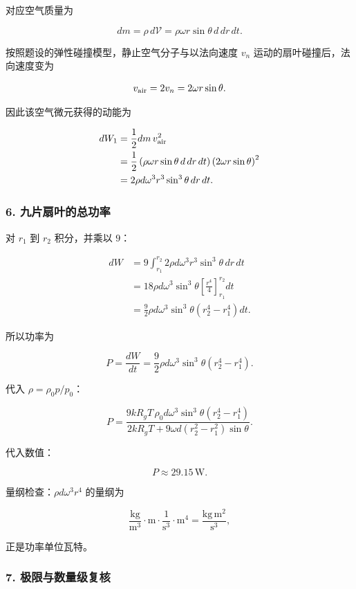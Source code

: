 \documentclass[12pt,a4paper,UTF8]{ctexart}
\begin{document}
对应空气质量为

\[
dm=\rho\,d\mathcal V
=\rho\omega r\sin\theta\,d\,dr\,dt.
\]

按照题设的弹性碰撞模型，静止空气分子与以法向速度 \(v_n\)
运动的扇叶碰撞后，法向速度变为

\[
v_{\rm air}=2v_n=2\omega r\sin\theta.
\]

因此该空气微元获得的动能为

\[
\begin{aligned}
dW_1
&=\frac12dm\,v_{\rm air}^2\\
&=\frac12\left(\rho\omega r\sin\theta\,d\,dr\,dt\right)
\left(2\omega r\sin\theta\right)^2\\
&=2\rho d\omega^3r^3\sin^3\theta\,dr\,dt.
\end{aligned}
\]

\subsubsection{6.
九片扇叶的总功率}\label{ux4e5dux7247ux6247ux53f6ux7684ux603bux529fux7387}

对 \(r_1\) 到 \(r_2\) 积分，并乘以 \(9\)：

\[
\begin{aligned}
dW
&=9\int_{r_1}^{r_2}
2\rho d\omega^3r^3\sin^3\theta\,dr\,dt\\
&=18\rho d\omega^3\sin^3\theta
\left[\frac{r^4}{4}\right]_{r_1}^{r_2}dt\\
&=\frac92\rho d\omega^3\sin^3\theta
(r_2^4-r_1^4)dt.
\end{aligned}
\]

所以功率为

\[
P=\frac{dW}{dt}
=\frac92\rho d\omega^3\sin^3\theta(r_2^4-r_1^4).
\]

代入 \(\rho=\rho_0p/p_0\)：

\[
\boxed{
P=
\frac{9kR_gT\,\rho_0d\omega^3\sin^3\theta(r_2^4-r_1^4)}
{2kR_gT+9\omega d(r_2^2-r_1^2)\sin\theta}
}.
\]

代入数值：

\[
\boxed{P\approx29.15\,\mathrm W}.
\]

量纲检查：\(\rho d\omega^3r^4\) 的量纲为

\[
\frac{\mathrm{kg}}{\mathrm{m^3}}\cdot\mathrm m
\cdot\frac{1}{\mathrm{s^3}}\cdot\mathrm{m^4}
=\frac{\mathrm{kg\,m^2}}{\mathrm{s^3}},
\]

正是功率单位瓦特。

\subsubsection{7.
极限与数量级复核}\label{ux6781ux9650ux4e0eux6570ux91cfux7ea7ux590dux6838}
\end{document}
